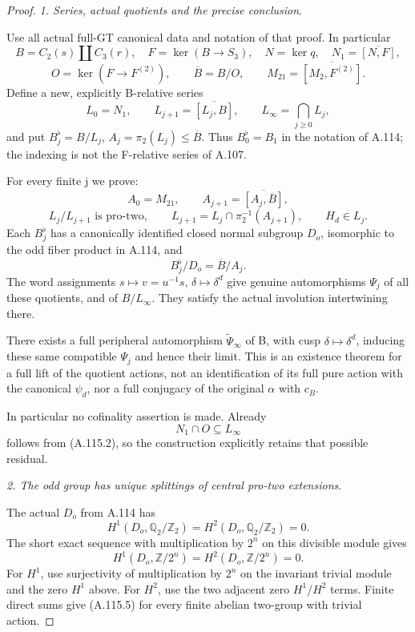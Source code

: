 \begin{proof}
\medskip\noindent\emph{1. Series, actual quotients and the precise conclusion}.

Use all actual full-GT canonical data and notation of that proof. In particular
\[
B=C_2(s)\amalg C_3(r),\quad F=\ker(B\to S_3),\quad
N=\ker q,\quad N_1=\overline{[N,F]},
\]
\[
O=\ker(F\to F^{(2)}),\qquad \overline B=B/O,\qquad
M_{21}=\overline{[M_2,F^{(2)}]}.
\]
Define a new, explicitly B-relative series
\[
L_0=N_1,\qquad L_{j+1}=\overline{[L_j,B]},\qquad
L_\infty=\bigcap_{j\ge0}L_j,
\]
and put \(B_j^\flat=B/L_j\), \(A_j=\pi_2(L_j)\le\overline B\). Thus \(B_0^\flat=B_1\) in the notation of A.114; the indexing is not the F-relative series of A.107.

For every finite j we prove:
\[
A_0=M_{21},\qquad A_{j+1}=\overline{[A_j,\overline B]},       \tag{A.115.1}
\]
\[
L_j/L_{j+1}\text{ is pro-two},\qquad
L_{j+1}=L_j\cap\pi_2^{-1}(A_{j+1}),\qquad H_d\in L_j.       \tag{A.115.2}
\]
Each \(B_j^\flat\) has a canonically identified closed normal subgroup \(D_o\), isomorphic to the odd fiber product in A.114, and
\[
B_j^\flat/D_o=\overline B/A_j.                              \tag{A.115.3}
\]
The word assignments \(s\mapsto v=u^{-1}s\), \(\delta\mapsto\delta^d\) give genuine automorphisms \(\Psi_j\) of all these quotients, and of \(B/L_\infty\). They satisfy the actual involution intertwining there.

There exists a full peripheral automorphism \(\widetilde\Psi_\infty\) of B, with cusp \(\delta\mapsto\delta^d\), inducing these same compatible \(\Psi_j\) and hence their limit. This is an existence theorem for a full lift of the quotient actions, not an identification of its full pure action with the canonical \(\psi_d\), nor a full conjugacy of the original \(\alpha\) with \(c_B\).

In particular no cofinality assertion is made. Already
\[
N_1\cap O\subseteq L_\infty                                  \tag{A.115.4}
\]
follows from (A.115.2), so the construction explicitly retains that possible residual.

\medskip\noindent\emph{2. The odd group has unique splittings of central pro-two extensions}.

The actual \(D_o\) from A.114 has
\[
H^1(D_o,\mathbb Q_2/\mathbb Z_2)
=H^2(D_o,\mathbb Q_2/\mathbb Z_2)=0.
\]
The short exact sequence with multiplication by \(2^n\) on this divisible module gives
\[
H^1(D_o,\mathbb Z/2^n)=H^2(D_o,\mathbb Z/2^n)=0.             \tag{A.115.5}
\]
For \(H^1\), use surjectivity of multiplication by \(2^n\) on the invariant trivial module and the zero \(H^1\) above. For \(H^2\), use the two adjacent zero \(H^1\)/\(H^2\) terms. Finite direct sums give (A.115.5) for every finite abelian two-group with trivial action.


\end{proof}

